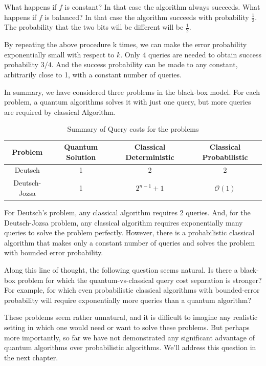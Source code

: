 \documentclass[12pt, oneside]{book}
\theoremstyle{definition}
\theoremstyle{definition}
\theoremstyle{remark}
\begin{document}
What happens if $f$ is constant? In that case the algorithm always succeeds. What happens if $f$ is balanced? In that case the algorithm succeeds with probability $\frac{1}{2}$. The probability that the two bits will be different will be $\frac{1}{2}$.

By repeating the above procedure k times, we can make the error probability exponentially small with respect to $k$. Only 4 queries are needed to obtain success probability $3/4$. And the success probability can be made to any constant, arbitrarily close to 1, with a constant number of queries.

In summary, we have considered three problems in the black-box model. For each problem, a quantum algorithms solves it with just one query, but more queries are required by classical Algorithm.

\begin{table}[H]
    \centering
    \begin{tabular}{|c|c|c|c|}
    \hline
        Problem & Quantum Solution & Classical Deterministic & Classical Probabilistic\\
        \hline
         Deutsch & 1 & 2 & 2\\
         \hline
         Deutsch-Jozsa & 1 & $2^{n-1}+1$ & $\mathcal{O}(1)$\\
         \hline
    \end{tabular}
    \caption{Summary of Query costs for the problems}
    \label{tab:deutsch_querycost}
\end{table}
For Deutsch's problem, any classical algorithm requires 2 queries. And, for the Deutsch-Jozsa problem, any classical algorithm requires exponentially many queries to solve the problem perfectly. However, there is a probabilistic classical algorithm that makes only a constant number of queries and solves the problem with bounded error probability.

Along this line of thought, the following question seems natural. Is there a black-box problem for which the quantum-vs-classical query cost separation is stronger? For example, for which even probabilistic classical algorithms with bounded-error probability will require exponentially more queries than a quantum algorithm?

These problems seem rather unnatural, and it is difficult to imagine any realistic setting in which one would need or want to solve these problems. But perhaps more importantly, so far we have not demonstrated any significant advantage of quantum algorithms over probabilistic algorithms. We'll address this question in the next chapter.
\end{document}

